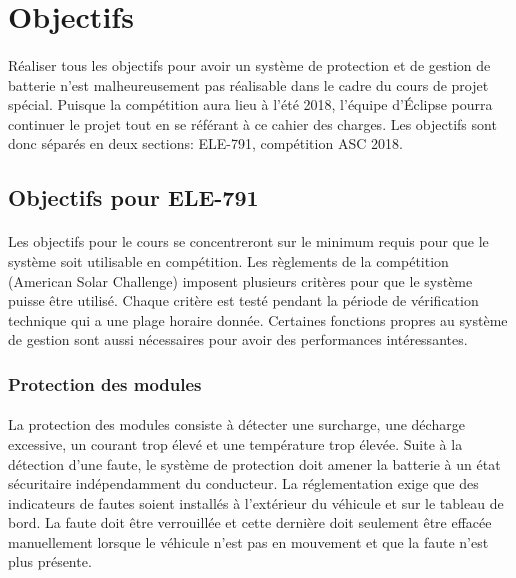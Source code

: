 
\section{Objectifs}
	\paragraph{}
	Réaliser tous les objectifs pour avoir un système de protection et de gestion de batterie  n'est malheureusement pas réalisable dans le cadre du cours de projet spécial. Puisque la compétition aura lieu à l'été 2018, l'équipe d'Éclipse pourra continuer le projet tout en se référant à ce cahier des charges. Les objectifs sont donc séparés en deux sections: ELE-791, compétition ASC 2018.  

	\subsection{Objectifs pour ELE-791}

		\paragraph{}	
		Les objectifs pour le cours se concentreront sur le minimum requis pour que le système soit utilisable en compétition. Les règlements de la compétition (American Solar Challenge) imposent plusieurs critères pour que le système puisse être utilisé. Chaque critère est testé pendant la période de vérification technique qui a une plage horaire donnée. Certaines fonctions propres au système de gestion sont aussi nécessaires pour avoir des performances intéressantes.
		
	\subsubsection{Protection des modules} \label{protection_module}

		\paragraph{}
		La protection des modules consiste à détecter une surcharge, une décharge excessive, un courant trop élevé et une température trop élevée. Suite à la détection d'une faute, le système de protection doit amener la batterie à un état sécuritaire indépendamment du conducteur. La réglementation exige que des indicateurs de fautes soient installés à l'extérieur du véhicule et sur le tableau de bord. La faute doit être verrouillée et cette dernière doit seulement être effacée manuellement lorsque le véhicule n'est pas en mouvement et que la faute n'est plus présente.
		

